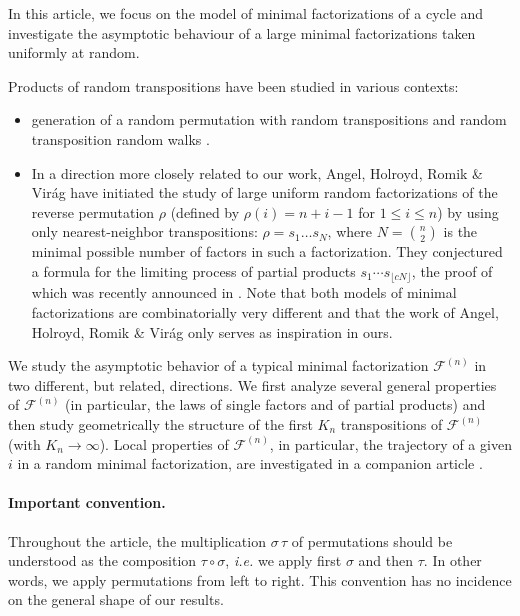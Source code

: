 \documentclass[AHL,XML,longabstracts,Unicode]{cedram}
\begin{document}
In this article, we focus on the model of minimal factorizations of a cycle and investigate
the asymptotic behaviour of a large minimal factorizations taken uniformly at random.


Products of random transpositions have been studied in various contexts:
\begin{itemize}
\item generation of a random permutation with random transpositions \cite{DS81,Scr05,DMZZ04} and random transposition random walks \cite{Tot93,BD06,Ber11}.
\item In a direction more closely related to our work, Angel, Holroyd, Romik \& Vir\'ag \cite{AHRV07} have initiated the study of large uniform random factorizations of the reverse permutation $\rho$ (defined by $\rho(i)=n+i-1$ for $1 \leq i \leq n$) by using only nearest-neighbor transpositions:
  \hbox{$\rho=s_1 \dots s_N$},
  where $N=\binom{n}{2}$ is the minimal possible number of factors in such a factorization.
They conjectured a formula for the limiting process of partial products $s_1 \cdots s_{\lfloor c N \rfloor}$,
the proof of which was recently announced in \cite{dauvergne2018archimedean}.
Note that both models of minimal factorizations are combinatorially very different and
that the work of Angel, Holroyd, Romik \& Vir\'ag only serves as inspiration in ours.
\end{itemize}

We study the asymptotic behavior of a typical minimal factorization $ \mathscr{F}^{(n)}$ in two different, but related, directions. We first analyze several general properties of $ \mathscr{F}^{(n)}$
(in particular, the laws of single factors and of partial products)
and then study geometrically the structure of the first $K_{n}$ transpositions of $ \mathscr{F}^{(n)}$
(with $K_{n} \rightarrow \infty$).
Local properties of $\mathscr{F}^{(n)}$, in particular, the trajectory
of a given $i$ in a random minimal factorization,
are investigated in a companion article \cite{FK18}.
\smallskip

\paragraph*{Important convention.} Throughout the article, the multiplication $\sigma\, \tau$ of permutations
should be understood as the composition $\tau \circ \sigma$, {\em i.e.}
we apply first $\sigma$ and then $\tau$.
In other words, we apply permutations from left to right.
This convention has no incidence on the general shape of our results.
\end{document}
